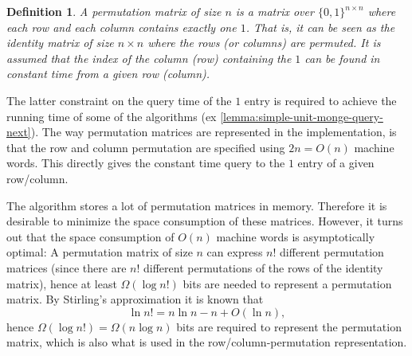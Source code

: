 \documentclass[twoside,11pt,openright]{report}
\newtheorem{mydef}{Definition}
\begin{document}
\begin{mydef}
  A permutation matrix of size $n$ is a matrix over $\{0,1\}^{n \times n}$ where each row and each column contains exactly one $1$. That is, it can be seen as the identity matrix of size $n \times n$ where the rows (or columns) are permuted.
  It is assumed that the index of the column (row) containing the $1$ can be found in constant time from a given row (column).
\end{mydef}
The latter constraint on the query time of the $1$ entry is required to achieve the running time of some of the algorithms (ex \cref{lemma:simple-unit-monge-query-next}). The way permutation matrices are represented in the implementation, is that the row and column permutation are specified using $2n = O(n)$ machine words. This directly gives the constant time query to the $1$ entry of a given row/column.

The algorithm stores a lot of permutation matrices in memory. Therefore it is desirable to minimize the space consumption of these matrices. However, it turns out that the space consumption of $O(n)$ machine words is asymptotically optimal: A permutation matrix of size $n$ can express $n!$ different permutation matrices (since there are $n!$ different permutations of the rows of the identity matrix), hence at least $\Omega(\log{n!})$ bits are needed to represent a permutation matrix. By Stirling's approximation it is known that
\[
  \ln{n!} = n \ln{n} - n + O(\ln{n}),
\]
hence $\Omega(\log{n!}) = \Omega(n \log{n})$ bits are required to represent the permutation matrix, which is also what is used in the row/column-permutation representation.
\end{document}
